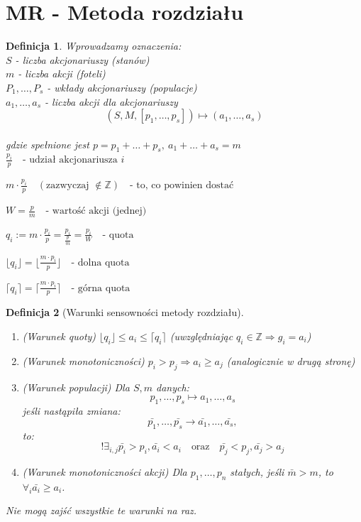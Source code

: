 \documentclass[12pt,a4paper]{article}
\theoremstyle{break}
\newtheorem{definition}{Definicja}[section]
\begin{document}
	\section{MR - Metoda rozdziału}
	\begin{definition}
		Wprowadzamy oznaczenia:\\
		$S$ - liczba akcjonariuszy (stanów)\\
		$m$ - liczba akcji (foteli)\\
		$P_1,\dots,P_s$ - wkłady akcjonariuszy (populacje)\\
		$a_1,\dots,a_s$ - liczba akcji dla akcjonariuszy\\
		
		$$(S,M,[p_1,\dots,p_s]) \longmapsto (a_1,\dots,a_s)$$\\
		gdzie spełnione jest $p=p_1+\dots+p_s,\: a_1+\dots+a_s=m$\\
		
		
		$\frac{p_i}{p} \quad \text{- udział akcjonariusza } i$
		
		
		$m\cdot\frac{p_i}{p} \quad (\text{zazwyczaj } \notin \mathbb{Z}) \quad \text{- to, co powinien dostać}$
		
		
		$W=\frac{p}{m} \quad \text{- wartość akcji (jednej)}$
		
		
		$q_i:= m\cdot \frac{p_i}{p} = \frac{p_i}{\frac{p}{m}} = \frac{p_i}{W} \quad \text{- quota}$
		
		
		$\lfloor q_i \rfloor=\lfloor \frac{m\cdot p_i}{p} \rfloor \quad \text{- dolna quota}$
		
		
		$\lceil q_i \rceil=\lceil \frac{m\cdot p_i}{p} \rceil \quad \text{- górna quota}$
		
	\end{definition}
	
	\begin{definition}[Warunki sensowności metody rozdziału]
		\begin{enumerate}[1.]
			\item (Warunek quoty) $\lfloor q_i \rfloor \leq a_i \leq \lceil q_i \rceil$ (uwzględniając $q_i \in \mathbb{Z} \Rightarrow g_i = a_i$)
			\item (Warunek monotoniczności) $p_i > p_j \Rightarrow a_i \geq a_j$ (analogicznie w drugą stronę)
			\item (Warunek populacji) Dla $S, m$ danych:
			\[
			p_1, \dots, p_s \longmapsto a_1, \dots, a_s
			\]
			jeśli nastąpiła zmiana:
			\[
			\bar{p_1}, \dots, \bar{p_s} \longrightarrow \bar{a_1}, \dots, \bar{a_s},
			\]
			to:
			\[
			!\exists_{i,j} \bar{p_i}>p_i, \bar{a_i}<a_i \quad \text{oraz} \quad \bar{p_j}<p_j, \bar{a_j}>a_j
			\]
			\item (Warunek monotoniczności akcji) Dla $p_1,\dots,p_n$ stałych, jeśli $\bar{m}>m$, to $\forall_i \bar{a_i} \geq a_i$.
		\end{enumerate}
		Nie mogą zajść wszystkie te warunki na raz.
	\end{definition}
	
\end{document}

